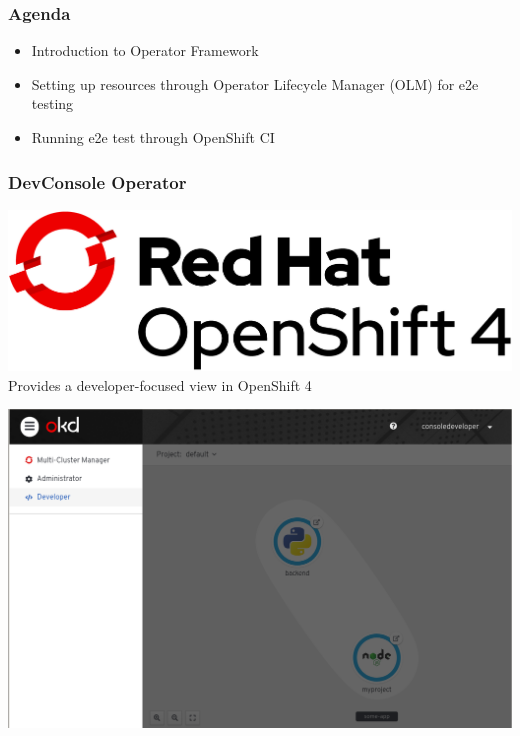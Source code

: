 \documentclass[aspectratio=169]{beamer}
\begin{document}
\begin{frame}
  \frametitle{Agenda}

  \begin{itemize}
  \item Introduction to Operator Framework
  \item Setting up resources through Operator Lifecycle Manager (OLM)
    for e2e testing
  \item Running e2e test through OpenShift CI
  \end{itemize}

\end{frame}

\begin{frame}
  \frametitle{DevConsole Operator}

  \includegraphics[scale=.15]{images/Logo-Red_Hat-OpenShift_4-A-Standard-RGB.png}\\[.25in]

  Provides a developer-focused view in OpenShift 4

\end{frame}

\begin{frame}

  \includegraphics[scale=.25]{images/devconsole.png}

\end{frame}
\end{document}
